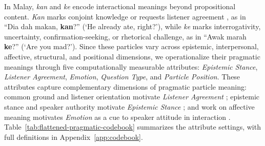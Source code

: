 \documentclass[11pt]{article}
\begin{document}
In Malay, \textit{kan} and \textit{ke} encode interactional meanings beyond propositional content. \textit{Kan} marks conjoint knowledge or requests listener agreement \citep{tay2016discourse,wouk1998solidarity}, as in ``Dia dah makan, \textbf{kan}?'' (`He already ate, right?'), while \textit{ke} marks interrogativity, uncertainty, confirmation-seeking, or rhetorical challenge, as in ``Awak marah \textbf{ke}?'' (`Are you mad?'). Since these particles vary across epistemic, interpersonal, affective, structural, and positional dimensions, we operationalize their pragmatic meanings through five computationally measurable attributes: \textit{Epistemic Stance}, \textit{Listener Agreement}, \textit{Emotion}, \textit{Question Type}, and \textit{Particle Position}. These attributes capture complementary dimensions of pragmatic particle meaning: common ground and listener orientation motivate \textit{Listener Agreement} \citep{wouk1998solidarity,stalnaker2002common}; epistemic stance and speaker authority motivate \textit{Epistemic Stance} \citep{karkkainen2003epistemic,grzech2021discourse}; and work on affective meaning motivates \textit{Emotion} as a cue to speaker attitude in interaction \citep{caffi1994pragmatics,buechel-hahn-2017-emobank}. Table~\ref{tab:flattened-pragmatic-codebook} summarizes the attribute settings, with full definitions in Appendix~\ref{app:codebook}.


\end{document}
